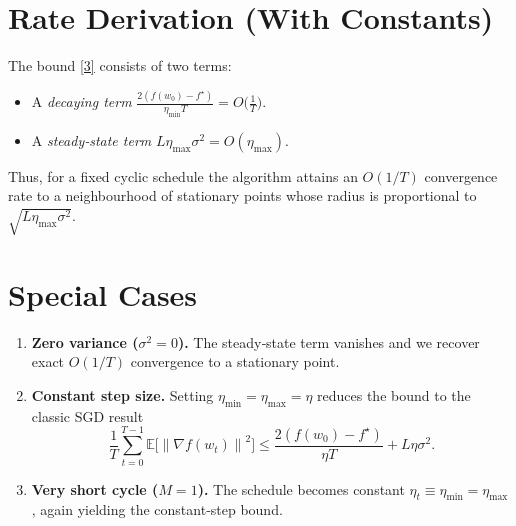 \documentclass{article}
\newcommand{\E}{\mathbb{E}}
\newcommand{\norm}[1]{\left\| #1 \right\|}
\begin{document}
\section*{Rate Derivation (With Constants)}
The bound \eqref{3} consists of two terms:
\begin{itemize}
\item A \emph{decaying term} $\displaystyle \frac{2(f(w_0)-f^{\star})}{\eta_{\min}T}=O\!\big(\frac1T\big)$.
\item A \emph{steady‑state term} $L\eta_{\max}\sigma^{2}=O(\eta_{\max})$.
\end{itemize}
Thus, for a fixed cyclic schedule the algorithm attains an $O(1/T)$ convergence rate to a neighbourhood of stationary points whose radius is proportional to $\sqrt{L\eta_{\max}\sigma^{2}}$.

\section*{Special Cases}
\begin{enumerate}
\item \textbf{Zero variance ($\sigma^{2}=0$).} The steady‑state term vanishes and we recover exact $O(1/T)$ convergence to a stationary point.
\item \textbf{Constant step size.} Setting $\eta_{\min}=\eta_{\max}=\eta$ reduces the bound to the classic SGD result
\[
\frac1T\sum_{t=0}^{T-1}\E\!\big[\norm{\nabla f(w_t)}^{2}\big]
\le\frac{2(f(w_0)-f^{\star})}{\eta T}+L\eta\sigma^{2}.
\]
\item \textbf{Very short cycle ($M=1$).} The schedule becomes constant $\eta_t\equiv\eta_{\min}=\eta_{\max}$, again yielding the constant‑step bound.
\end{enumerate}
\end{document}
